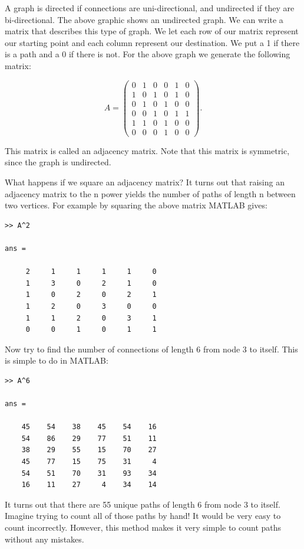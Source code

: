 A graph is directed if connections are uni-directional, and undirected if they are bi-directional. The above graphic shows an undirected graph. We can write a matrix that describes this type of graph. We let each row of our matrix represent our starting point and each column represent our destination. We put a 1 if there is a path and a 0 if there is not. For the above graph we generate the following matrix:

\[
A = \begin{pmatrix}
0 & 1 & 0 & 0 & 1 & 0\\
1 & 0 & 1 & 0 & 1 & 0\\
0 & 1 & 0 & 1 & 0 & 0\\
0 & 0 & 1 & 0 & 1 & 1\\
1 & 1 & 0 & 1 & 0 & 0\\
0 & 0 & 0 & 1 & 0 & 0
\end{pmatrix}.
\]

This matrix is called an adjacency matrix. Note that this matrix is symmetric, since the graph is undirected.

What happens if we square an adjacency matrix? It turns out that raising an adjacency matrix to the n power yields the number of paths of length n between two vertices. For example by squaring the above matrix MATLAB gives:

\begin{verbatim}
>> A^2

ans =

     2     1     1     1     1     0
     1     3     0     2     1     0
     1     0     2     0     2     1
     1     2     0     3     0     0
     1     1     2     0     3     1
     0     0     1     0     1     1
\end{verbatim}

Now try to find the number of connections of length 6 from node 3 to itself. This is simple to do in MATLAB:

\begin{verbatim}
>> A^6

ans =

    45    54    38    45    54    16
    54    86    29    77    51    11
    38    29    55    15    70    27
    45    77    15    75    31     4
    54    51    70    31    93    34
    16    11    27     4    34    14
\end{verbatim}

It turns out that there are 55 unique paths of length 6 from node 3 to itself. Imagine trying to count all of those paths by hand! It would be very easy to count incorrectly. However, this method makes it very simple to count paths without any mistakes.

